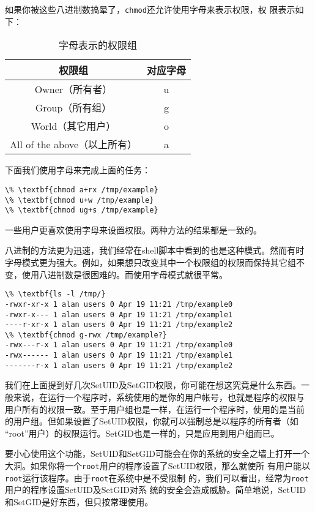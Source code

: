 如果你被这些八进制数搞晕了，\texttt{chmod}还允许使用字母来表示权限，权
限表示如下：
\begin{table}[htpb]
  \centering
  \begin{tabular}{c|c}
    \hline \hline
    权限组 & 对应字母 \\ \hline
    Owner（所有者） & u \\
    Group（所有组） & g \\
    World（其它用户）& o \\
    All of the above（以上所有）& a \\
    \hline\hline
  \end{tabular}
  \caption{字母表示的权限组}
  \label{tab:permissionsWithLetters}
\end{table}

下面我们使用字母来完成上面的任务：
\begin{Verbatim}[frame=single, commandchars=\\\{\}]
\% \textbf{chmod a+rx /tmp/example}
\% \textbf{chmod u+w /tmp/example}
\% \textbf{chmod ug+s /tmp/example}
\end{Verbatim}

一些用户更喜欢使用字母来设置权限。两种方法的结果都是一致的。

八进制的方法更为迅速，我们经常在shell脚本中看到的也是这种模式。然而有时
字母模式更为强大。例如，如果想只改变其中一个权限组的权限而保持其它组不
变，使用八进制数是很困难的。而使用字母模式就很平常。
\begin{Verbatim}[frame=single, commandchars=\\\{\}]
\% \textbf{ls -l /tmp/}
-rwxr-xr-x 1 alan users 0 Apr 19 11:21 /tmp/example0 
-rwxr-x--- 1 alan users 0 Apr 19 11:21 /tmp/example1
----r-xr-x 1 alan users 0 Apr 19 11:21 /tmp/example2
\% \textbf{chmod g-rwx /tmp/example?}
-rwx---r-x 1 alan users 0 Apr 19 11:21 /tmp/example0 
-rwx------ 1 alan users 0 Apr 19 11:21 /tmp/example1
-------r-x 1 alan users 0 Apr 19 11:21 /tmp/example2
\end{Verbatim}

我们在上面提到好几次SetUID及SetGID权限，你可能在想这究竟是什么东西。一
般来说，在运行一个程序时，系统使用的是你的用户帐号，也就是程序的权限与
用户所有的权限一致。至于用户组也是一样，在运行一个程序时，使用的是当前
的用户组。但如果设置了SetUID权限，你就可以强制总是以程序的所有者（如
``root''用户）的权限运行。SetGID也是一样的，只是应用到用户组而已。

要小心使用这个功能，SetUID和SetGID可能会在你的系统的安全之墙上打开一个
大洞。如果你将一个\texttt{root}用户的程序设置了SetUID权限，那么就使所
有用户能以\texttt{root}运行该程序。由于\texttt{root}在系统中是不受限制
的，我们可以看出，经常为\texttt{root}用户的程序设置SetUID及SetGID对系
统的安全会造成威胁。简单地说，SetUID和SetGID是好东西，但只按常理使用。


